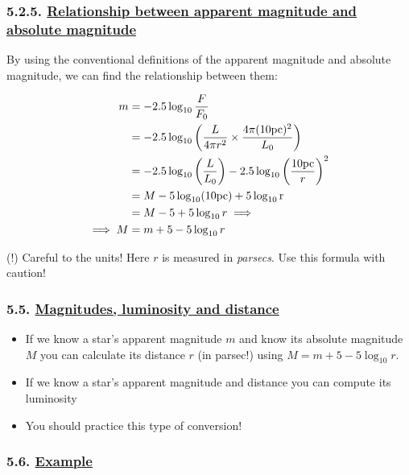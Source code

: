 \documentclass[
  letterpaper,
  DIV=11,
  numbers=noendperiod]{scrartcl}
\providecommand{\tightlist}{%
  \setlength{\itemsep}{0pt}\setlength{\parskip}{0pt}}\usepackage{longtable,booktabs,array}
\begin{document}
\hypertarget{relationship-between-apparent-magnitude-and-absolute-magnitude}{%
\subsubsection{\texorpdfstring{5.2.5.
\protect\hyperlink{toc0_}{Relationship between apparent magnitude and
absolute
magnitude}}{5.2.5. Relationship between apparent magnitude and absolute magnitude}}\label{relationship-between-apparent-magnitude-and-absolute-magnitude}}

By using the conventional definitions of the apparent magnitude and
absolute magnitude, we can find the relationship between them:

\begin{align}
m &= -2.5\log_{10}{\frac{F}{F_0}} \\
&= -2.5\log_{10}\left(\frac{L}{4\pi r^2}\times \frac{4\pi (10\rm{pc})^2}{L_0} \right) \\
& =-2.5\log_{10}\left(\frac{L}{L_0}\right) -2.5\log_{10} \left( \frac{10\rm{pc}}{r}\right)^2\\
& = M -5\log_{10}(10\rm{pc})+5\log_{10}{r}\\
& = M -5 + 5\log_{10}{r} \implies \\
\implies M &= m + 5 - 5\log_{10} r
\end{align}

(!) Careful to the units! Here \(r\) is measured in \emph{parsecs}. Use
this formula with caution!

\hypertarget{magnitudes-luminosity-and-distance}{%
\subsubsection{\texorpdfstring{5.5.
\protect\hyperlink{toc0_}{Magnitudes, luminosity and
distance}}{5.5. Magnitudes, luminosity and distance}}\label{magnitudes-luminosity-and-distance}}

\begin{itemize}
\tightlist
\item
  If we know a star's apparent magnitude \(m\) and know its absolute
  magnitude \(M\) you can calculate its distance \(r\) (in parsec!)
  using \(M=m + 5 - 5\log_{10} r\).
\item
  If we know a star's apparent magnitude and distance you can compute
  its luminosity
\item
  You should practice this type of conversion!
\end{itemize}

\hypertarget{example-1}{%
\subsubsection{\texorpdfstring{5.6.
\protect\hyperlink{toc0_}{Example}}{5.6. Example}}\label{example-1}}
\end{document}
